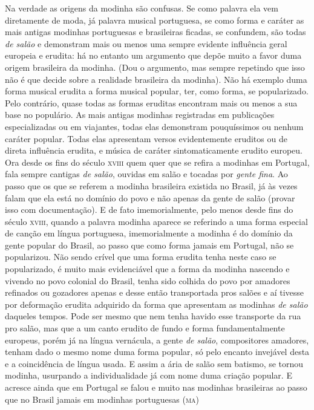 Na verdade as origens da modinha são confusas. Se como palavra ela vem
diretamente de moda, já palavra musical portuguesa, se como forma e
caráter as mais antigas modinhas portuguesas e brasileiras ficadas, se
confundem, são todas \textit{de salão} e demonstram mais ou menos uma sempre
evidente influência geral europeia e erudita: há no entanto um argumento
que depõe muito a favor duma origem brasileira da modinha. (Dou o
argumento, mas sempre repetindo que isso não é que decide sobre a
realidade brasileira da modinha). Não há exemplo duma forma musical
erudita a forma musical popular, ter, como forma, se popularizado. Pelo
contrário, quase todas as formas eruditas encontram mais ou menos a sua
base no populário. As mais antigas modinhas registradas em publicações
especializadas ou em viajantes, todas elas demonstram pouquíssimos ou
nenhum caráter popular. Todas elas apresentam versos evidentemente
eruditos ou de direta influência erudita, e música de caráter
sintomaticamente erudito europeu. Ora desde os fins do século \textsc{xviii} quem
quer que se refira a modinhas em Portugal, fala sempre cantigas \textit{de
salão}, ouvidas em salão e tocadas por \textit{gente fina}. Ao passo que os que
se referem a modinha brasileira existida no Brasil, já às vezes falam
que ela está no domínio do povo e não apenas da gente de salão (provar
isso com documentação). E de fato imemorialmente, pelo menos desde fins
do século \textsc{xviii}, quando a palavra modinha aparece se referindo a uma forma
especial de canção em língua portuguesa, imemorialmente a modinha é do
domínio da gente popular do Brasil, ao passo que como forma jamais em
Portugal, não se popularizou. Não sendo crível que uma forma erudita
tenha neste caso se popularizado, é muito mais evidenciável que a forma
da modinha nascendo e vivendo no povo colonial do Brasil, tenha sido
colhida do povo por amadores refinados ou gozadores apenas e desse então
transportada pros salões e aí tivesse por deformação erudita adquirido
da forma que apresentam as modinhas \textit{de salão} daqueles tempos. Pode
ser mesmo que nem tenha havido esse transporte da rua pro salão, mas que
a um canto erudito de fundo e forma fundamentalmente europeus, porém já
na língua vernácula, a gente \textit{de salão}, compositores amadores, tenham
dado o mesmo nome duma forma popular, só pelo encanto invejável desta e
a coincidência de língua usada. E assim a ária de salão sem batismo, se
tornou modinha, usurpando a individualidade já com nome duma criação
popular. E acresce ainda que em Portugal se falou e muito nas modinhas
brasileiras ao passo que no Brasil jamais em modinhas portuguesas (\textsc{ma})

